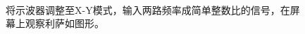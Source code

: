 \documentclass{article} %
\begin{document}
\begin{figure}
 \\
\caption{将示波器调整至X-Y模式，输入两路频率成简单整数比的信号，在屏幕上观察利萨如图形。}\label{fig:1}
\end{figure}
\end{document}
